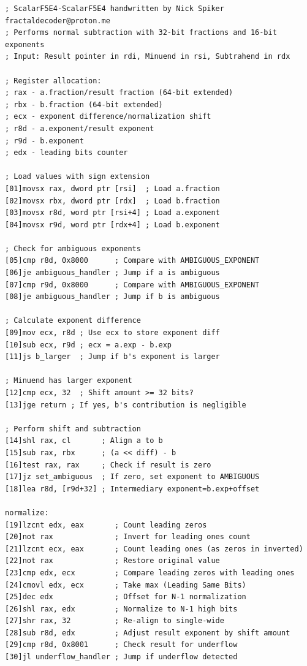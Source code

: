 \documentclass[12pt,letter]{article}
\begin{document}
\begin{lstlisting}[style=rust, caption={Assembly Implementation of Scalar Subtraction}, label={fig:scalar_subtract}]
; ScalarF5E4-ScalarF5E4 handwritten by Nick Spiker fractaldecoder@proton.me
; Performs normal subtraction with 32-bit fractions and 16-bit exponents
; Input: Result pointer in rdi, Minuend in rsi, Subtrahend in rdx

; Register allocation:
; rax - a.fraction/result fraction (64-bit extended)
; rbx - b.fraction (64-bit extended)
; ecx - exponent difference/normalization shift
; r8d - a.exponent/result exponent
; r9d - b.exponent
; edx - leading bits counter

; Load values with sign extension
[01]movsx rax, dword ptr [rsi]  ; Load a.fraction
[02]movsx rbx, dword ptr [rdx]  ; Load b.fraction
[03]movsx r8d, word ptr [rsi+4] ; Load a.exponent
[04]movsx r9d, word ptr [rdx+4] ; Load b.exponent

; Check for ambiguous exponents
[05]cmp r8d, 0x8000      ; Compare with AMBIGUOUS_EXPONENT
[06]je ambiguous_handler ; Jump if a is ambiguous
[07]cmp r9d, 0x8000      ; Compare with AMBIGUOUS_EXPONENT
[08]je ambiguous_handler ; Jump if b is ambiguous

; Calculate exponent difference
[09]mov ecx, r8d ; Use ecx to store exponent diff
[10]sub ecx, r9d ; ecx = a.exp - b.exp
[11]js b_larger  ; Jump if b's exponent is larger

; Minuend has larger exponent
[12]cmp ecx, 32  ; Shift amount >= 32 bits?
[13]jge return ; If yes, b's contribution is negligible

; Perform shift and subtraction
[14]shl rax, cl       ; Align a to b
[15]sub rax, rbx      ; (a << diff) - b
[16]test rax, rax     ; Check if result is zero
[17]jz set_ambiguous  ; If zero, set exponent to AMBIGUOUS
[18]lea r8d, [r9d+32] ; Intermediary exponent=b.exp+offset

normalize:
[19]lzcnt edx, eax       ; Count leading zeros
[20]not rax              ; Invert for leading ones count
[21]lzcnt ecx, eax       ; Count leading ones (as zeros in inverted)
[22]not rax              ; Restore original value
[23]cmp edx, ecx         ; Compare leading zeros with leading ones
[24]cmovl edx, ecx       ; Take max (Leading Same Bits)
[25]dec edx              ; Offset for N-1 normalization
[26]shl rax, edx         ; Normalize to N-1 high bits
[27]shr rax, 32          ; Re-align to single-wide
[28]sub r8d, edx         ; Adjust result exponent by shift amount
[29]cmp r8d, 0x8001      ; Check result for underflow
[30]jl underflow_handler ; Jump if underflow detected


\end{lstlisting}
\end{document}
